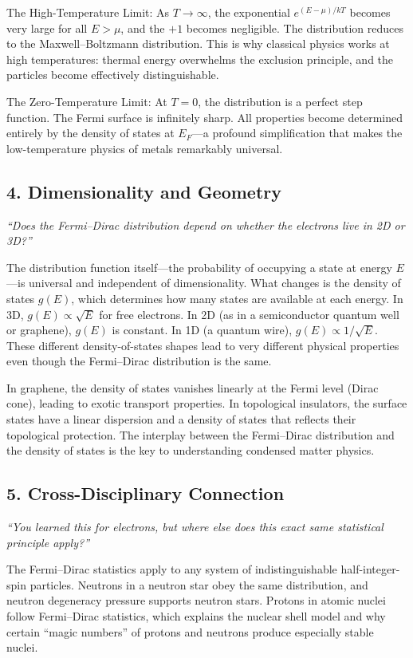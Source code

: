 The High-Temperature Limit: As $T \to \infty$, the exponential $e^{(E-\mu)/kT}$ becomes very large for all $E > \mu$, and the $+1$ becomes negligible. The distribution reduces to the Maxwell--Boltzmann distribution. This is why classical physics works at high temperatures: thermal energy overwhelms the exclusion principle, and the particles become effectively distinguishable.

The Zero-Temperature Limit: At $T = 0$, the distribution is a perfect step function. The Fermi surface is infinitely sharp. All properties become determined entirely by the density of states at $E_F$---a profound simplification that makes the low-temperature physics of metals remarkably universal.

\subsection*{4. Dimensionality and Geometry}
\textit{``Does the Fermi--Dirac distribution depend on whether the electrons live in 2D or 3D?''}

The distribution function itself---the probability of occupying a state at energy $E$---is universal and independent of dimensionality. What changes is the density of states $g(E)$, which determines how many states are available at each energy. In 3D, $g(E) \propto \sqrt{E}$ for free electrons. In 2D (as in a semiconductor quantum well or graphene), $g(E)$ is constant. In 1D (a quantum wire), $g(E) \propto 1/\sqrt{E}$. These different density-of-states shapes lead to very different physical properties even though the Fermi--Dirac distribution is the same.

In graphene, the density of states vanishes linearly at the Fermi level (Dirac cone), leading to exotic transport properties. In topological insulators, the surface states have a linear dispersion and a density of states that reflects their topological protection. The interplay between the Fermi--Dirac distribution and the density of states is the key to understanding condensed matter physics.

\subsection*{5. Cross-Disciplinary Connection}
\textit{``You learned this for electrons, but where else does this exact same statistical principle apply?''}

The Fermi--Dirac statistics apply to any system of indistinguishable half-integer-spin particles. Neutrons in a neutron star obey the same distribution, and neutron degeneracy pressure supports neutron stars. Protons in atomic nuclei follow Fermi--Dirac statistics, which explains the nuclear shell model and why certain ``magic numbers'' of protons and neutrons produce especially stable nuclei.

